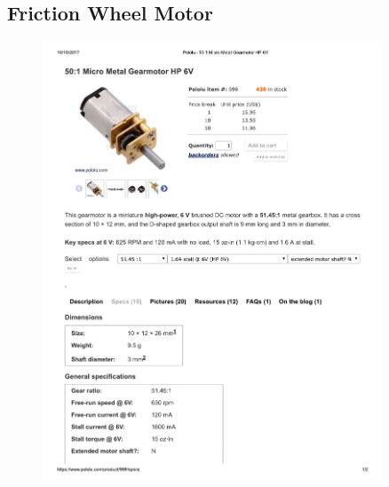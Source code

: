 \documentclass[../main.tex]{subfiles}
\begin{document}
\subsection{Friction Wheel Motor \cite{FrictionMotor}} \label{FrictionMotor}
\begin{figure}[H]
	\centering
	\includegraphics[width=0.9\textwidth]{img/specs/Friction-Wheel-Motor-Specs.pdf}
\end{figure}

\end{document}
